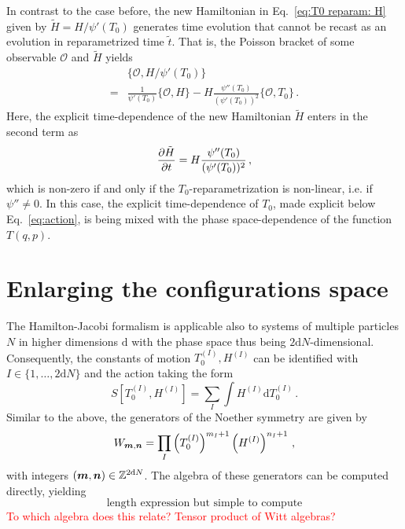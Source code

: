 \documentclass[twocolumn,notitlepage,superscriptaddress, nofootinbib,nobibnotes, aps,prd,10pt]{revtex4-1}%
\def\dd{\mathrm{d}}
\begin{document}
In contrast to the case before, the new Hamiltonian in Eq.~\eqref{eq:T0 reparam: H} given by $\tilde{H} = H/\psi'(T_0)$ generates time evolution that cannot be recast as an evolution in reparametrized time $\tilde{t}$. That is, the Poisson bracket of some observable $\mathcal{O}$ and $\tilde{H}$ yields
%
\begin{equation}
\begin{aligned}
&\{\mathcal{O},H/\psi'(T_0)\} \\
=& \frac{1}{\psi'(T_0)}\{\mathcal{O},H\}-H\frac{\psi''(T_0)}{(\psi'(T_0))^2}\{\mathcal{O},T_0\}\, .
\end{aligned}
\end{equation}
%
Here, the explicit time-dependence of the new Hamiltonian $\tilde{H}$ enters in the second term as
%
\begin{equation}
\pdv{\tilde{H}}{t} = H\frac{\psi''(T_0)}{(\psi'(T_0))^2}\, ,
\end{equation}
%
which is non-zero if and only if the $T_0$-reparametrization is non-linear, i.e. if $\psi''\neq 0$. In this case, the explicit time-dependence of $T_0$, made explicit below Eq.~\eqref{eq:action}, is being mixed with the phase space-dependence of the function $T(q,p)$.  

\section{Enlarging the configurations space}\label{sec:Extension}

The Hamilton-Jacobi formalism is applicable also to systems of multiple particles $N$ in higher dimensions $\mathrm{d}$ with the phase space thus being $2\mathrm{d}N$-dimensional. Consequently, the constants of motion $T_0^{(I)},H^{(I)}$ can be identified with $I\in\{1,\dots, 2\mathrm{d}N\}$ and the action taking the form
%
\begin{equation}
S[T_0^{(I)},H^{(I)}] = \sum_I\int H^{(I)}\dd{T_0^{(I)}}\, .
\end{equation}
%
Similar to the above, the generators of the Noether symmetry are given by
%
\begin{equation}
    W_{\vb*{m},\vb*{n}} = \prod_I \left(T_0^{(I)}\right)^{m_I+1}\left(H^{(I)}\right)^{n_I+1}\, , 
\end{equation}
%
with integers $(\vb*{m},\vb*{n})\in\mathbb{Z}^{2\mathrm{d}N}$. The algebra of these generators can be computed directly, yielding
%
\begin{equation}
\text{length expression but simple to compute}
\end{equation}
%
\textcolor{red}{To which algebra does this relate? Tensor product of Witt algebras?}
\end{document}
